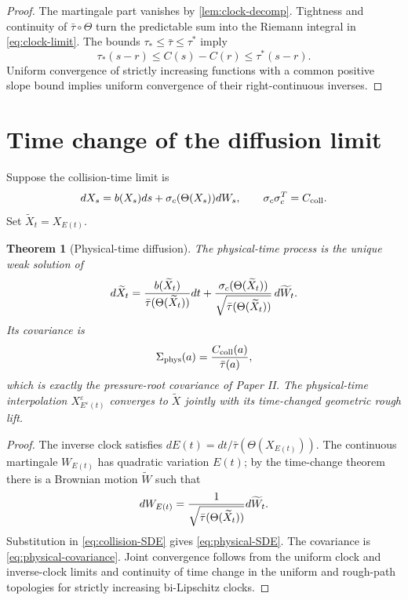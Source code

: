 \documentclass[11pt,reqno]{amsart}
\newtheorem{theorem}{Theorem}[section]
\theoremstyle{definition}
\begin{document}
\begin{proof}
The martingale part vanishes by \cref{lem:clock-decomp}.  Tightness and
continuity of $\bar\tau\circ\Theta$ turn the predictable sum into the Riemann
integral in \eqref{eq:clock-limit}.  The bounds
$\tau_*\le\bar\tau\le\tau^*$ imply
\[
 \tau_*(s-r)\le C(s)-C(r)\le\tau^*(s-r).
\]
Uniform convergence of strictly increasing functions with a common positive
slope bound implies uniform convergence of their right-continuous inverses.
\end{proof}

\section{Time change of the diffusion limit}

Suppose the collision-time limit is
\begin{equation}\label{eq:collision-SDE}
 dX_s=b(X_s)ds+\sigma_c(\Theta(X_s))dW_s,
 \qquad \sigma_c\sigma_c^T=C_{\rm coll}.
\end{equation}
Set $\widetilde X_t=X_{E(t)}$.

\begin{theorem}[Physical-time diffusion]\label{thm:physical-SDE}
The physical-time process is the unique weak solution of
\begin{equation}\label{eq:physical-SDE}
 d\widetilde X_t=
 {b(\widetilde X_t)\over\bar\tau(\Theta(\widetilde X_t))}dt
 +{\sigma_c(\Theta(\widetilde X_t))
   \over\sqrt{\bar\tau(\Theta(\widetilde X_t))}}\,d\widetilde W_t.
\end{equation}
Its covariance is
\begin{equation}\label{eq:physical-covariance}
 \Sigma_{\rm phys}(a)={C_{\rm coll}(a)\over\bar\tau(a)},
\end{equation}
which is exactly the pressure-root covariance of Paper II.  The physical-time
interpolation $X^\varepsilon_{E^\varepsilon(t)}$ converges to
$\widetilde X$ jointly with its time-changed geometric rough lift.
\end{theorem}

\begin{proof}
The inverse clock satisfies
$dE(t)=dt/\bar\tau(\Theta(X_{E(t)}))$.  The continuous martingale
$W_{E(t)}$ has quadratic variation $E(t)$; by the time-change theorem there is
a Brownian motion $\widetilde W$ such that
\[
 dW_{E(t)}={1\over\sqrt{\bar\tau(\Theta(\widetilde X_t))}}d\widetilde W_t.
\]
Substitution in \eqref{eq:collision-SDE} gives
\eqref{eq:physical-SDE}.  The covariance is
\eqref{eq:physical-covariance}.  Joint convergence follows from the uniform
clock and inverse-clock limits and continuity of time change in the uniform
and rough-path topologies for strictly increasing bi-Lipschitz clocks.
\end{proof}
\end{document}
